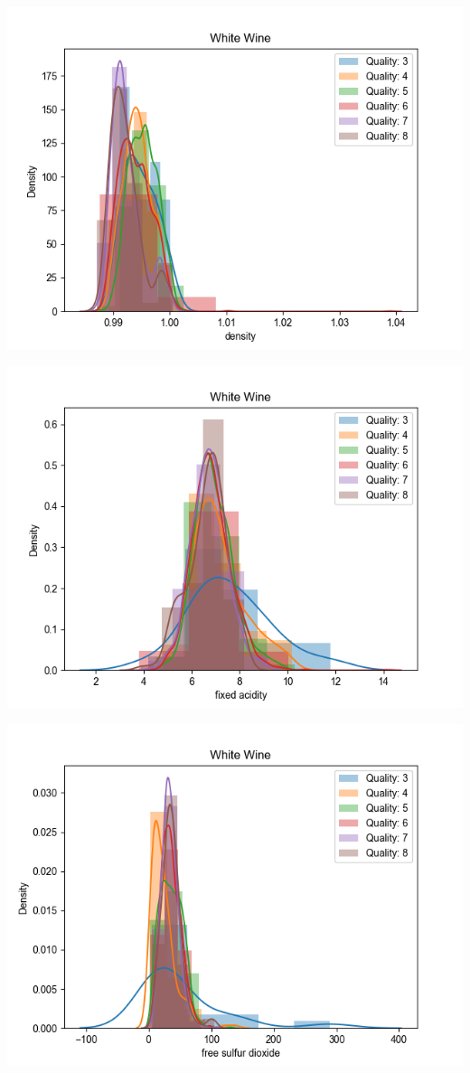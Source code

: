 \documentclass[12pt, letterpaper]{article}
\begin{document}
\includegraphics[scale=\myscale]{white_quality_dist_density.png}

\includegraphics[scale=\myscale]{white_quality_dist_fixed_acidity.png}

\includegraphics[scale=\myscale]{white_quality_dist_free_sulfur_dioxide.png}
\end{document}
